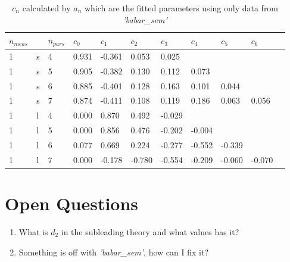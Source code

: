 \documentclass[a4paper,12pt]{article}
\begin{document}
\begin{table}[H]
    \begin{tabular}{|l|l|l|l|l|l|l|l|l|l|l|}
        \hline
        $n_{meas}$&&$n_{pars}$&$c_0$ & $c_1$& $c_2$ & $c_3$ & $c_4$ & $c_5$ & $c_6$\\
        \hline
        1&s&4&0.931&-0.361&0.053&0.025\\
        1&s&5&0.905&-0.382&0.130&0.112&0.073\\
        1&s&6&0.885&-0.401&0.128&0.163&0.101&0.044\\
        1&s&7&0.874&-0.411&0.108&0.119&0.186&0.063&0.056\\
        1&l&4&0.000&0.870&0.492&-0.029\\
        1&l&5&0.000&0.856&0.476&-0.202&-0.004\\
        1&l&6&0.077&0.669&0.224&-0.277&-0.552&-0.339\\
        1&l&7&0.000&-0.178&-0.780&-0.554&-0.209&-0.060&-0.070\\
        \hline
    \end{tabular}
    \caption{$c_n$ calculated by $a_n$ which are the fitted parameters using only data from \textit{'babar\_sem'}}
\end{table}

\section{Open Questions}

\begin{enumerate}
    \item What is $d_2$ in the subleading theory and what values has it?
    \item Something is off with \textit{'babar\_sem'}, how can I fix it?
\end{enumerate}
\end{document}
